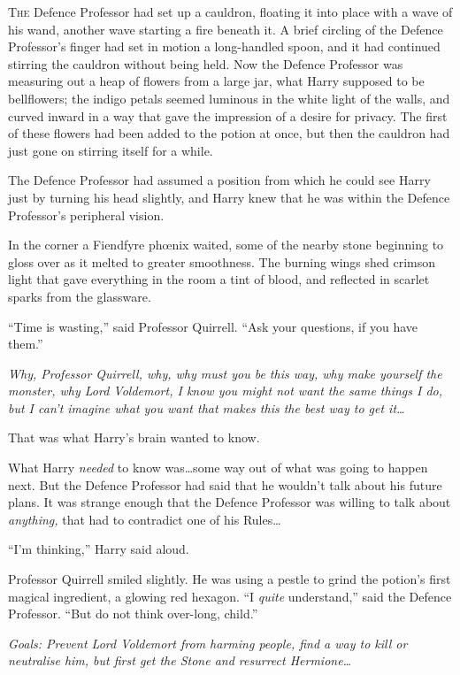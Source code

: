 
\lettrine{T}{he} Defence Professor had set up a cauldron, floating it into place with a wave of his wand, another wave starting a fire beneath it. A brief circling of the Defence Professor’s finger had set in motion a long-handled spoon, and it had continued stirring the cauldron without being held. Now the Defence Professor was measuring out a heap of flowers from a large jar, what Harry supposed to be bellflowers; the indigo petals seemed luminous in the white light of the walls, and curved inward in a way that gave the impression of a desire for privacy. The first of these flowers had been added to the potion at once, but then the cauldron had just gone on stirring itself for a while.

The Defence Professor had assumed a position from which he could see Harry just by turning his head slightly, and Harry knew that he was within the Defence Professor’s peripheral vision.

In the corner a Fiendfyre phœnix waited, some of the nearby stone beginning to gloss over as it melted to greater smoothness. The burning wings shed crimson light that gave everything in the room a tint of blood, and reflected in scarlet sparks from the glassware.

“Time is wasting,” said Professor Quirrell. “Ask your questions, if you have them.”

\emph{Why, Professor Quirrell, why, why must you be this way, why make yourself the monster, why Lord Voldemort, I know you might not want the same things I do, but I can’t imagine what you want that makes \emph{this} the best way to get it…}

That was what Harry’s brain wanted to know.

What Harry \emph{needed} to know was…some way out of what was going to happen next. But the Defence Professor had said that he wouldn’t talk about his future plans. It was strange enough that the Defence Professor was willing to talk about \emph{anything,} that had to contradict one of his Rules…

“I’m thinking,” Harry said aloud.

Professor Quirrell smiled slightly. He was using a pestle to grind the potion’s first magical ingredient, a glowing red hexagon. “I \emph{quite} understand,” said the Defence Professor. “But do not think over-long, child.”

\emph{Goals: Prevent Lord Voldemort from harming people, find a way to kill or neutralise him, but first get the Stone and resurrect Hermione…}

